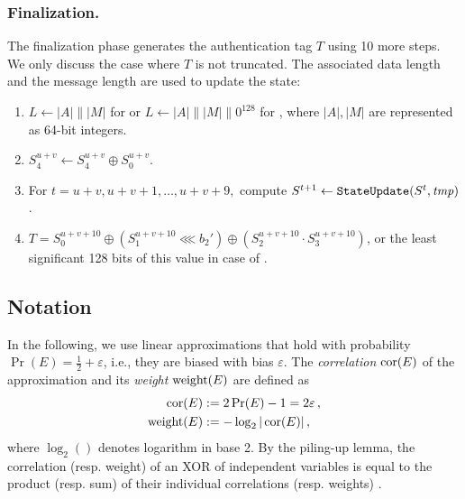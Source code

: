 \subsubsection{Finalization.}
The finalization phase generates the authentication tag $T$ using 10 more \StateUpdate{} steps. We only discuss the case where $T$ is not truncated. The associated data length and the message length are used to update the state:
\begin{enumerate}
\item $L \leftarrow |A| \mathrel\| |M|$ for \MORUS[640] or $L \leftarrow |A| \mathrel\| |M| \mathrel\|0^{128}$ for \MORUS[1280], where $|A|, |M|$ are represented as 64-bit integers.
\item $S^{u+v}_4 \leftarrow S^{u+v}_4 \oplus S^{u+v}_0.$
\item For $t = u+v, u+v+1, \ldots, u+v+9,$ compute
$S^{t+1} \leftarrow \texttt{StateUpdate}{} (S^t, {\it tmp})$.
\item $T = S^{u+v+10}_0 \oplus (S^{u+v+10}_1 \lll b_2') \oplus ( S^{u+v+10}_2 \cdot S^{u+v+10}_3)$, or the least significant 128 bits of this value in case of \MORUS[1280].
\end{enumerate}

\subsection{Notation}
\label{subsec/Notation}

In the following, we use linear approximations \cite{eurocryptMatsui93}
that hold with probability $\Pr(E) = \frac{1}{2} + \varepsilon$, i.e., they are biased with bias $\varepsilon$.
The \emph{correlation} $\operatorname{cor}(E)$ of the approximation and its \emph{weight} $\operatorname{weight}(E)$ are defined as
\begin{align*}
\operatorname{cor}(E) &:= 2\Pr(E)-1 = 2 \varepsilon\,, \\
\operatorname{weight}(E) &:= -\log_2|\operatorname{cor}(E)|\,,
\end{align*}
where $\log_2()$ denotes logarithm in base 2. By the piling-up lemma, the correlation (resp. weight) of an XOR of independent variables is equal to the product (resp. sum) of their individual correlations (resp. weights) \cite{eurocryptMatsui93}.

